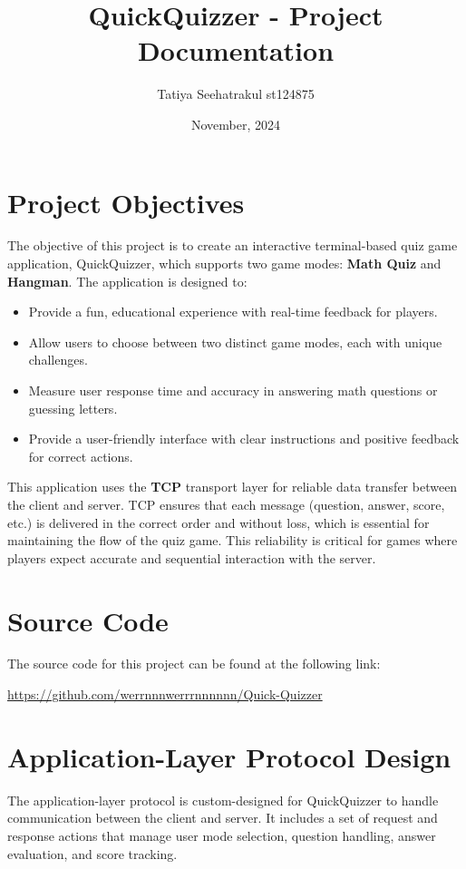 \documentclass[12pt]{article}
\title{QuickQuizzer - Project Documentation}
\author{Tatiya Seehatrakul st124875}
\date{November, 2024}
\begin{document}
\maketitle

\section{Project Objectives}
The objective of this project is to create an interactive terminal-based quiz game application, QuickQuizzer, which supports two game modes: \textbf{Math Quiz} and \textbf{Hangman}. The application is designed to:
\begin{itemize}
    \item Provide a fun, educational experience with real-time feedback for players.
    \item Allow users to choose between two distinct game modes, each with unique challenges.
    \item Measure user response time and accuracy in answering math questions or guessing letters.
    \item Provide a user-friendly interface with clear instructions and positive feedback for correct actions.
\end{itemize}

This application uses the \textbf{TCP} transport layer for reliable data transfer between the client and server. TCP ensures that each message (question, answer, score, etc.) is delivered in the correct order and without loss, which is essential for maintaining the flow of the quiz game. This reliability is critical for games where players expect accurate and sequential interaction with the server.

\section{Source Code}
The source code for this project can be found at the following link:

\url{https://github.com/werrnnnwerrrnnnnnn/Quick-Quizzer}

\newpage
\section{Application-Layer Protocol Design}
The application-layer protocol is custom-designed for QuickQuizzer to handle communication between the client and server. It includes a set of request and response actions that manage user mode selection, question handling, answer evaluation, and score tracking. 
\end{document}
